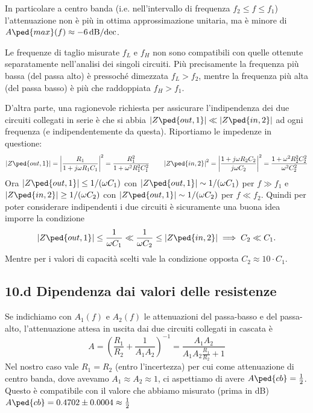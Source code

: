 \documentclass[10pt,a4paper]{article}
\begin{document}
In particolare a centro banda (i.e. nell'intervallo di frequenza
$f_2 \leq f \leq f_1$) l'attenuazione non è più in ottima approssimazione
unitaria, ma è minore di $A\ped{max}(f) \approx \SI{-6}{\dB/dec}$.

Le frequenze di taglio misurate $f_L$ e $f_H$ non sono compatibili con quelle
ottenute separatamente nell'analisi dei singoli circuiti. Più precisamente
la frequenza più bassa (del passa alto) è pressoché dimezzata
$f_L > f_2$, mentre la frequenza più alta (del passa basso) è più che
raddoppiata $f_H > f_1$.

D'altra parte, una ragionevole richiesta per assicurare l'indipendenza dei due
circuiti collegati in serie è che si abbia
$\abs{Z\ped{out, 1}} \ll \abs{Z\ped{in,2}}$ ad ogni frequenza (e 
indipendentemente da questa). Riportiamo le impedenze in questione:
\[
\abs{Z\ped{out, 1}} = \abs{\frac{R_1}{1 + j \omega R_1 C_1}}^2 = 
\frac{R_1^2}{1 + \omega^2 R_1^2 C_1^2}
\qquad
\abs{Z\ped{in, 2}}^2 = \abs{\frac{1 + j \omega R_2 C_2}{j\omega 
C_2}}^2 = \frac{1 + \omega^2 R_2^2 C_2^2}{\omega^2 C_2^2}
\]
Ora $\abs{Z\ped{out, 1}} \leq 1/(\omega C_1)$ con $\abs{Z\ped{out, 
1}} \sim 1/(\omega C_1)$ per $f \gg f_1 $ e $\abs{Z\ped{in, 2}} 
\geq 1/(\omega C_2)$ con $\abs{Z\ped{out, 1}} \sim 1/(\omega C_2) 
$ per $ f \ll f_2 $. Quindi per poter considerare indipendenti i due circuiti
è sicuramente una buona idea imporre la condizione
\[
\abs{Z\ped{out, 1}} \leq \frac{1}{\omega C_1} \ll \frac{1}{\omega C_2} \leq 
\abs{Z\ped{in, 2}} \implies C_2 \ll C_1.
\]
Mentre per i valori di capacità scelti vale la condizione opposta
$C_2 \approx 10 \cdot C_1$.

\subsection*{10.d Dipendenza dai valori delle resistenze}
Se indichiamo con $A_1(f)$ e $A_2(f)$ le attenuazioni del passa-basso e del
passa-alto, l'attenuazione attesa in uscita dai due circuiti collegati in
cascata è
\begin{equation}\label{eq: bpfgain}
A = \left(\frac{R_1}{R_2} + \frac{1}{A_1 A_2}\right)^{-1} = 
\frac{A_1 A_2}{A_1 A_2 \frac{R_1}{R_2} + 1} 
\end{equation}
Nel nostro caso vale $R_1 = R_2$ (entro l'incertezza) per cui come
attenuazione di centro banda, dove avevamo $A_1 \approx A_2 \approx 1$, ci
aspettiamo di avere $A\ped{cb} = \frac{1}{2}$.
Questo è compatibile con il valore che abbiamo misurato (prima in dB)
$A\ped{cb} = 0.4702 \pm 0.0004 \approx \frac{1}{2}$
\end{document}
